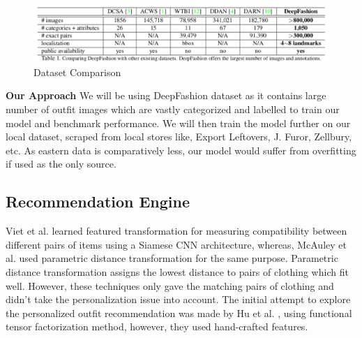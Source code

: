 \begin{figure}[H]
\includegraphics[width=15cm]{images/dataset-comparision.pdf} 
\centering
\caption{Dataset Comparison}
\label{dataset:home}
\end{figure}

 
\textbf{Our Approach} \newline
We will be using DeepFashion dataset as it contains large number of outfit images which are vastly categorized and labelled to train our model and benchmark performance. We will then train the model further on our local dataset, scraped from local stores like, Export Leftovers, J. Furor, Zellbury, etc. As eastern data is comparatively less, our model would suffer from overfitting if used as the only source. 

\subsection{Recommendation Engine}


Viet et al. \cite{paper4} learned featured transformation for measuring compatibility between different pairs of items using a Siamese CNN architecture, whereas, McAuley et al. \cite{paper5} used parametric distance transformation for the same purpose. Parametric distance transformation assigns the lowest distance to pairs of clothing which fit well. However, these techniques only gave the matching pairs of clothing and didn’t take the personalization issue into account. The initial attempt to explore the personalized outfit recommendation was made by Hu et al. \cite{paperseven}, using functional tensor factorization method, however, they used hand-crafted features.  \newline

